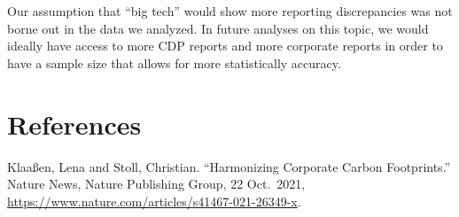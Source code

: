 \documentclass[
  12pt,
]{article}
\begin{document}
Our assumption that ``big tech'' would show more reporting discrepancies
was not borne out in the data we analyzed. In future analyses on this
topic, we would ideally have access to more CDP reports and more
corporate reports in order to have a sample size that allows for more
statistically accuracy.

\newpage

\hypertarget{references}{%
\section{References}\label{references}}

Klaaßen, Lena and Stoll, Christian. ``Harmonizing Corporate Carbon
Footprints.'' Nature News, Nature Publishing Group, 22 Oct.~2021,
\url{https://www.nature.com/articles/s41467-021-26349-x}.
\end{document}
